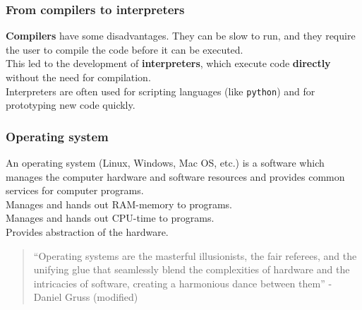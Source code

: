 \documentclass{beamer}
\begin{document}
\begin{frame}
  \frametitle{From compilers to interpreters}
  \textbf{Compilers} have some disadvantages. They can be slow to run, and they require the user to compile the code before it can be executed.\\
  This led to the development of \textbf{interpreters}, which execute code \textbf{directly} without the need for compilation. \\
  Interpreters are often used for scripting languages (like \texttt{python}) and for prototyping new code quickly.
\end{frame}
\begin{frame}
  \frametitle{Operating system}
  An operating system (Linux, Windows, Mac OS, etc.) is a software which manages the computer hardware and software resources and provides common services for computer programs.\\
  \vspace{5mm}
  Manages and hands out RAM-memory to programs.\\ 
  \vspace{5mm}
  Manages and hands out CPU-time to programs.\\
  \vspace{5mm}
  Provides abstraction of the hardware.\\
\end{frame}
\begin{frame}
  \vspace*{\fill}
  \begin{center}
    \begin{quote}
        ``Operating systems are the masterful illusionists, the fair referees, and the unifying glue that seamlessly blend the complexities of hardware and the intricacies of software, creating a harmonious dance between them'' - Daniel Gruss (modified)
    \end{quote}
\end{center}
\vspace*{\fill}
\end{frame}
\end{document}
